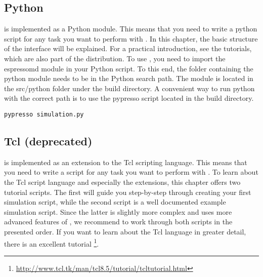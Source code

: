\subsection{Python}
\es is implemented as a Python module.
This means that you need to write a python script for any task you want to
perform with \es. In this chapter, the basic structure of the interface will be explained. For a practical introduction, see the tutorials, which are also part of the \es distribution.
To use \es, you need to import the espressomd module in your Python script. To this end, the folder containing the python module needs to be in the Python search path. The module is located in the src/python folder under the build directory.
A convenient way to run python with the correct path is to use the pypresso script located in the build directory. 
\begin{verbatim}
pypresso simulation.py
\end{verbatim}



\subsection{Tcl (deprecated)}
\es is implemented as an extension to the Tcl scripting language.
This means that you need to write a script for any task you want to
perform with \es. To learn about the Tcl script language and
especially the \es extensions, this chapter offers two tutorial
scripts. The first will guide you step-by-step through creating your
first simulation script, while the second script is a well documented
example simulation script. Since the latter is slightly more complex
and uses more advanced features of \es, we recommend to work through
both scripts in the presented order.  If you want to learn about the
Tcl language in greater detail, there is an excellent tutorial
\footnote{\url{http://www.tcl.tk/man/tcl8.5/tutorial/tcltutorial.html}}.


